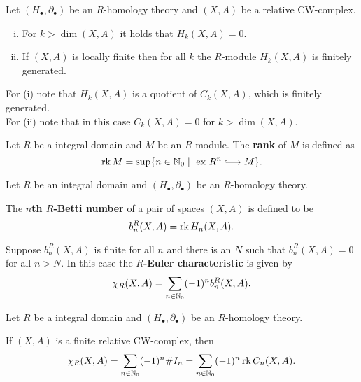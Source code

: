 	\begin{corollary}
		Let $(H_\bullet, \partial_\bullet)$ be an $R$-homology theory and $(X,A)$ be a relative CW-complex.
		\begin{enumerate}[(i)]
			\item{
				For $k>\dim(X,A)$ it holds that $H_k(X,A) =0$.
			}
			\item{
				If $(X,A)$ is locally finite then for all $k$ the $R$-module $H_k(X,A)$ is finitely generated.
			}
		\end{enumerate}
	\end{corollary}
	\begin{sketch}
		For (i) note that $H_k(X,A)$ is a quotient of $C_k(X,A)$, which is finitely generated.\\
		For (ii) note that in this case $C_k(X,A) = 0$ for $k > \dim(X,A)$.
	\end{sketch}


	\begin{remark}
		Let $R$ be a integral domain and $M$ be an $R$-module. The \textbf{rank} of $M$ is defined as 
		\begin{equation*}
			\rk M = \sup\{n \in \N_0 \mid \text{ ex } R^n \longrightincl M\}.
		\end{equation*}

	\end{remark}

	\begin{definition}
		Let $R$ be an integral domain and $(H_\bullet, \partial_\bullet)$ be an $R$-homology theory.

		The \textbf{$n$th $R$-Betti number} of a pair of spaces $(X,A)$ is defined to be
		\begin{equation*}
			b_n^R (X,A) = \operatorname{rk} H_n(X,A).
		\end{equation*}

		Suppose $b_n^R(X,A)$ is finite for all $n$ and there is an $N$ such that $b_n^R(X,A) = 0$ for all $n > N$. In this case the \textbf{$R$-Euler characteristic} is given by
		\begin{equation*}
			\chi_R(X,A) = \sum \limits_{n \in \mathbb{N}_0} (-1)^n b_n^R(X,A).
		\end{equation*}
	\end{definition}

	\begin{proposition}
		Let $R$ be a integral domain and $(H_\bullet, \partial_\bullet)$ be an $R$-homology theory.

		If $(X,A)$ is a finite relative CW-complex, then
		\begin{equation*}
			\chi_R(X,A) = \sum \limits_{n \in \mathbb{N}_0}(-1)^n \#I_n = \sum \limits_{n \in \mathbb{N}_0} (-1)^n \operatorname{rk} C_n(X,A).
		\end{equation*}
	\end{proposition}



